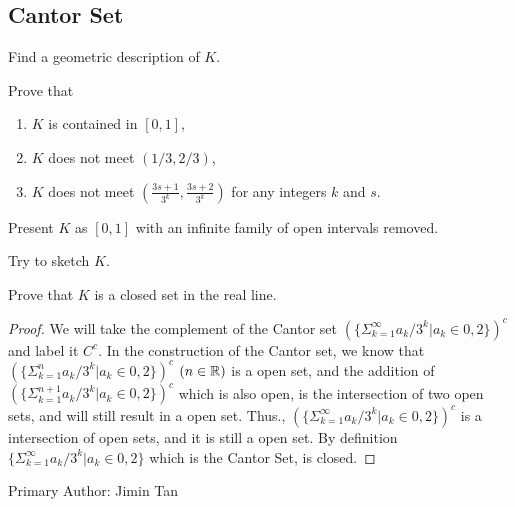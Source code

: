 \subsection{Cantor Set}

\begin{majorEx}
    Find a geometric description of $K$.

    Prove that
    \begin{enumerate}
        \item $K$ is contained in $[0,1]$,
        \item $K$ does not meet $(1/3, 2/3)$,
        \item $K$ does not meet $\left( \frac{3s+1}{3^k}, \frac{3s+2}{3^k}
            \right)$ for any integers $k$ and $s$.
    \end{enumerate}

    Present $K$ as $[0,1]$ with an infinite family of open intervals removed.

    Try to sketch $K$.
\end{majorEx}

\begin{majorEx}
Prove that $K$ is a closed set in the real line.
\end{majorEx}

\begin{proof}
We will take the complement of the Cantor set $(\{\Sigma_{k=1}^\infty a_k/3^k | a_k \in {0, 2}\})^c$ and label it $C^c$. In the construction of the
Cantor set, we know that $(\{\Sigma_{k=1}^n a_k/3^k | a_k \in {0, 2}\})^c$ $(n \in \mathbb{R})$ is a open set, and the addition of $(\{\Sigma_{k=1}^{n+1} a_k/3^k | a_k \in {0, 2}\})^c$ which is also open, is the intersection of two open sets, and will still result in a open set. Thus., $(\{\Sigma_{k=1}^\infty a_k/3^k | a_k \in {0, 2}\})^c$ is a intersection of open sets, and it is still a open set. By definition $\{\Sigma_{k=1}^\infty a_k/3^k | a_k \in {0, 2}\}$ which is the Cantor Set, is closed.
\end{proof}

Primary Author: Jimin Tan
